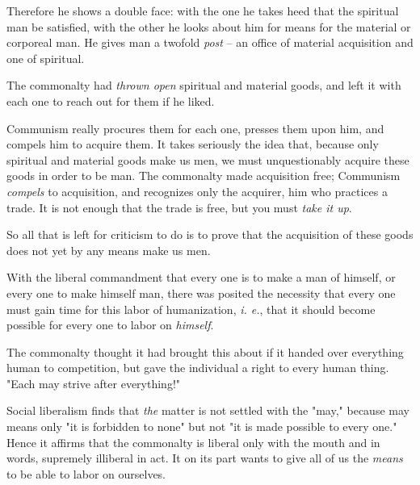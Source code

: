 \documentclass[a4paper]{book}
\begin{document}
Therefore he shows a double face: with the one he takes heed that the 
spiritual man be satisfied, with the other he looks about him for means for 
the material or corporeal man. He gives man a twofold \textit{post} -- an 
office of material acquisition and one of spiritual.

The commonalty had \textit{thrown open} spiritual and material goods, and left 
it with each one to reach out for them if he liked.

Communism really procures them for each one, presses them upon him, and 
compels him to acquire them. It takes seriously the idea that, because only 
spiritual and material goods make us men, we must unquestionably acquire these 
goods in order to be man. The commonalty made acquisition free; Communism 
\textit{compels} to acquisition, and recognizes only the acquirer, him who 
practices a trade. It is not enough that the trade is free, but you must 
\textit{take it up}.

So all that is left for criticism to do is to prove that the acquisition of 
these goods does not yet by any means make us men.

With the liberal commandment that every one is to make a man of himself, or 
every one to make himself man, there was posited the necessity that every one 
must gain time for this labor of humanization, \textit{i. e.}, that it should 
become possible for every one to labor on \textit{himself}.

The commonalty thought it had brought this about if it handed over everything 
human to competition, but gave the individual a right to every human thing. 
"{}Each may strive after everything!"{}

Social liberalism finds that \textit{the} matter is not settled with the 
"{}may,"{} because may means only "{}it is forbidden to none"{} but not "{}it 
is made possible to every one."{} Hence it affirms that the commonalty is 
liberal only with the mouth and in words, supremely illiberal in act. It on 
its part wants to give all of us the \textit{means} to be able to labor on 
ourselves.
\end{document}
